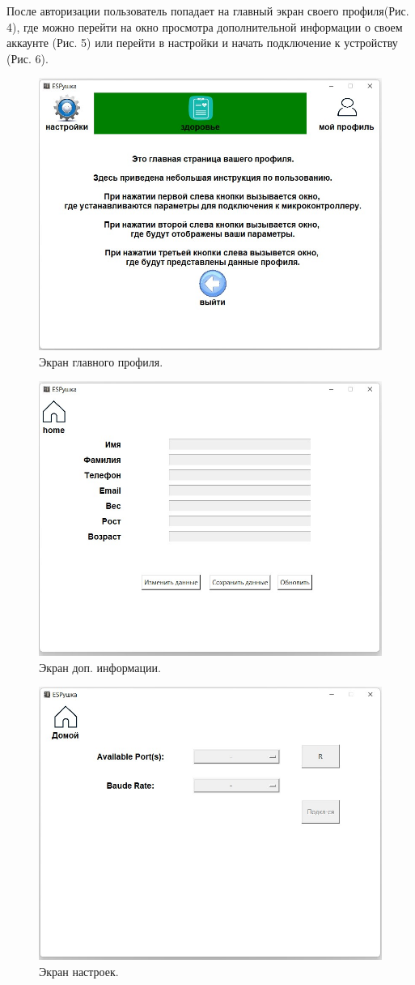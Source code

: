 \documentclass[a4document]{article}
\begin{document}
{\newpage\noindent
После авторизации пользователь попадает на главный экран своего профиля(Рис. 4), где можно перейти на окно просмотра дополнительной информации о своем аккаунте (Рис. 5) или перейти в настройки  и начать подключение к устройству (Рис. 6).

\begin{figure}[htp]
    \centering
    \includegraphics[width=0.6\linewidth]{Pics/ProfileScreen.jpg}
    \caption{Экран главного профиля.}
    \label{fig:pic4}
\end{figure}

\begin{figure}[htp]
    \centering
    \includegraphics[width=0.5\linewidth]{Pics/AdditionalInfoScreen.jpg}
    \caption{Экран доп. информации.}
    \label{fig:pk2}
\end{figure}

\begin{figure}[htp]
    \centering
    \includegraphics[width=0.5\linewidth]{Pics/SettingsScreen.jpg}
    \caption{Экран настроек.}
    \label{fig:pk2}
\end{figure}

}
\end{document}

